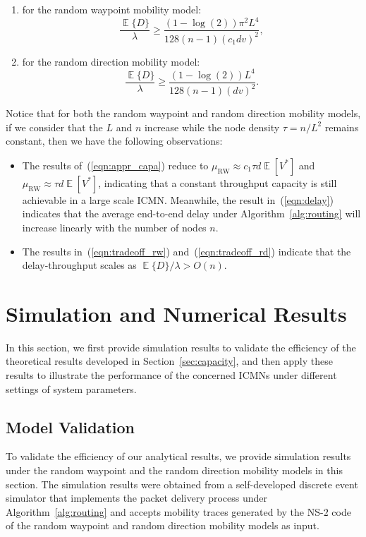 \documentclass[twocolumn, 10pt]{svjour3}         \smartqed  \usepackage{graphicx}
\DeclareMathOperator*{\E}{\mathbb{E}}
\begin{document}
\begin{enumerate}
	\item for the random waypoint mobility model:
\begin{equation}
	\frac{\E\{D\}}{\lambda} \geq \frac{  (1-\log (2) ) \pi^2 L^4}{128 (n-1) (c_1 d  v)^2   },\label{eqn:tradeoff_rw}
\end{equation}
 \item for the random direction mobility model:
\begin{equation}
	\frac{\E\{D\}}{\lambda} \geq \frac{ (1-\log (2) ) L^4}{128 (n-1) ( d  v)^2   }.\label{eqn:tradeoff_rd}
\end{equation} 
\end{enumerate}



\begin{remark}\label{remark:corollary_1}
Notice that for both the random waypoint and random direction mobility models, if we consider that the   $L$ and $n$ increase while  the node density $\tau = n/L^2 $ remains constant, then we have the following observations:
\begin{itemize}
	\item The results of~(\ref{eqn:appr_capa}) reduce to $\mu_{\text{RW}} \approx  c_1 \tau d   \E[V^*]$ and $\mu_{\text{RW}} \approx   \tau d   \E[V^*]$, indicating that a constant throughput capacity is still achievable in  a large scale ICMN.
Meanwhile, the result in~(\ref{eqn:delay}) indicates that the average end-to-end delay under Algorithm~\ref{alg:routing} will increase linearly with the number of nodes $n$.
	\item The results in~(\ref{eqn:tradeoff_rw}) and~(\ref{eqn:tradeoff_rd})  indicate that the delay-throughput scales as ${\E\{D\}} / {\lambda} > O(n)$.
\end{itemize}


\end{remark}



\section{Simulation and Numerical Results}\label{sec:numerical}
In this section, we first provide simulation results to validate the efficiency of the theoretical results developed in Section~\ref{sec:capacity}, and then apply these results to illustrate the performance of the concerned ICMNs under different settings of system parameters.
\subsection{Model Validation}
To validate the efficiency of our analytical results, we provide simulation results under the random waypoint and  the random direction mobility models in this section.
The simulation results were obtained from a self-developed  discrete event simulator that implements the packet delivery process under Algorithm~\ref{alg:routing} and accepts  mobility traces generated by the NS-$2$ code of the random waypoint and random direction mobility models as input.
\end{document}
